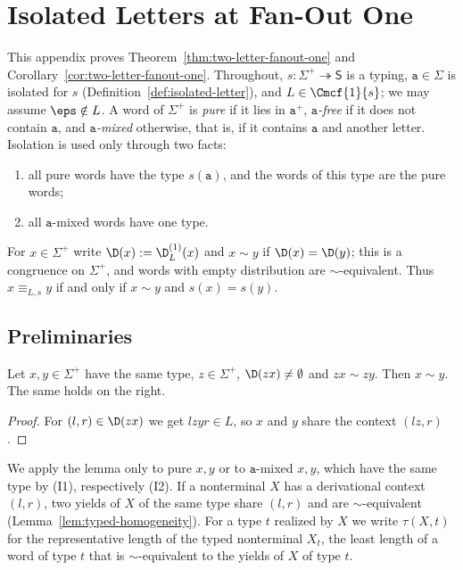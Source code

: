 \section{Isolated Letters at Fan-Out One}
\label{app:two-letter-fanout-one}

This appendix proves Theorem~\ref{thm:two-letter-fanout-one} and
Corollary~\ref{cor:two-letter-fanout-one}.  Throughout,
$s:\Sigma^+\twoheadrightarrow\mathsf S$ is a typing, $\mathtt a\in\Sigma$ is isolated
for $s$ (Definition~\ref{def:isolated-letter}), and $L\in\Cmcf{1}{s}$; we may
assume $\eps\notin L$.  A word of $\Sigma^+$ is \emph{pure} if it lies in
$\mathtt a^+$, \emph{$\mathtt a$-free} if it does not contain $\mathtt a$, and
\emph{$\mathtt a$-mixed} otherwise, that is, if it contains $\mathtt a$ and another
letter.  Isolation is used only through two facts:
\begin{enumerate}[label=\textup{(I\arabic*)},leftmargin=*]
\item all pure words have the type $s(\mathtt a)$, and the words of this type are
the pure words;
\item all $\mathtt a$-mixed words have one type.
\end{enumerate}
For $x\in\Sigma^+$ write $\D(x):=\D^{(1)}_L(x)$ and $x\sim y$ if
$\D(x)=\D(y)$; this is a congruence on $\Sigma^+$, and words with empty
distribution are $\sim$-equivalent.  Thus $x\equiv_{L,s}y$ if and only if
$x\sim y$ and $s(x)=s(y)$.

\subsection{Preliminaries}

\begin{lemma}[Cancellation]
\label{lem:app-h-cancel}
Let $x,y\in\Sigma^+$ have the same type, $z\in\Sigma^+$, $\D(zx)\ne\emptyset$
and $zx\sim zy$.  Then $x\sim y$.  The same holds on the right.
\end{lemma}

\begin{proof}
For $(l,r)\in\D(zx)$ we get $lzyr\in L$, so $x$ and $y$ share the context
$(lz,r)$.
\end{proof}

We apply the lemma only to pure $x,y$ or to $\mathtt a$-mixed $x,y$, which have
the same type by (I1), respectively (I2).  If a nonterminal $X$ has a
derivational context $(l,r)$, two yields of $X$ of the same type share $(l,r)$
and are $\sim$-equivalent (Lemma~\ref{lem:typed-homogeneity}).  For a type $t$
realized by $X$ we write $\tau(X,t)$ for the representative length of the typed
nonterminal $X_t$, the least length of a word of type $t$ that is
$\sim$-equivalent to the yields of $X$ of type $t$.

